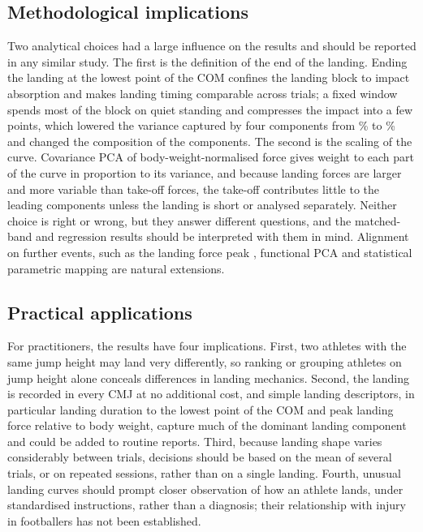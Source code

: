 \subsection{Methodological implications}

Two analytical choices had a large influence on the results and should be reported in any similar study. The first is the definition of the end of the landing. Ending the landing at the lowest point of the COM confines the landing block to impact absorption and makes landing timing comparable across trials; a fixed window spends most of the block on quiet standing and compresses the impact into a few points, which lowered the variance captured by four components from \cumFour\% to \cumFourS\% and changed the composition of the components. The second is the scaling of the curve. Covariance PCA of body-weight-normalised force gives weight to each part of the curve in proportion to its variance, and because landing forces are larger and more variable than take-off forces, the take-off contributes little to the leading components unless the landing is short or analysed separately. Neither choice is right or wrong, but they answer different questions, and the matched-band and regression results should be interpreted with them in mind. Alignment on further events, such as the landing force peak \citep{moudy2018}, functional PCA \citep{ramsay2005,warmenhoven2019} and statistical parametric mapping \citep{pataky2013} are natural extensions.

\subsection{Practical applications}

For practitioners, the results have four implications. First, two athletes with the same jump height may land very differently, so ranking or grouping athletes on jump height alone conceals differences in landing mechanics. Second, the landing is recorded in every CMJ at no additional cost, and simple landing descriptors, in particular landing duration to the lowest point of the COM and peak landing force relative to body weight, capture much of the dominant landing component and could be added to routine reports. Third, because landing shape varies considerably between trials, decisions should be based on the mean of several trials, or on repeated sessions, rather than on a single landing. Fourth, unusual landing curves should prompt closer observation of how an athlete lands, under standardised instructions, rather than a diagnosis; their relationship with injury in footballers has not been established.

